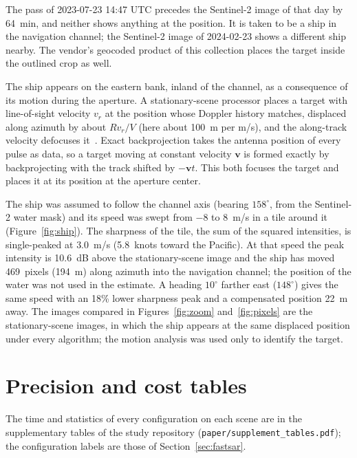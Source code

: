 \documentclass[11pt]{article}
\begin{document}
The pass of 2023-07-23 14:47 UTC precedes the Sentinel-2 image of that day by 64~min, and neither shows anything at the position. It is taken to be a ship in the navigation channel; the Sentinel-2 image of 2024-02-23 shows a different ship nearby. The vendor's geocoded product of this collection places the target inside the outlined crop as well.

The ship appears on the eastern bank, inland of the channel, as a consequence of its motion during the aperture. A stationary-scene processor places a target with line-of-sight velocity $v_r$ at the position whose Doppler history matches, displaced along azimuth by about $R v_r / V$ (here about 100~m per m/s), and the along-track velocity defocuses it~\cite{raney1971}. Exact backprojection takes the antenna position of every pulse as data, so a target moving at constant velocity $\mathbf{v}$ is formed exactly by backprojecting with the track shifted by $-\mathbf{v} t$. This both focuses the target and places it at its position at the aperture center.

The ship was assumed to follow the channel axis (bearing $158^\circ$, from the Sentinel-2 water mask) and its speed was swept from $-8$ to $8$~m/s in a tile around it (Figure~\ref{fig:ship}). The sharpness of the tile, the sum of the squared intensities, is single-peaked at $3.0$~m/s (5.8~knots toward the Pacific). At that speed the peak intensity is 10.6~dB above the stationary-scene image and the ship has moved 469~pixels (194~m) along azimuth into the navigation channel; the position of the water was not used in the estimate. A heading $10^\circ$ farther east ($148^\circ$) gives the same speed with an 18\% lower sharpness peak and a compensated position 22~m away. The images compared in Figures~\ref{fig:zoom} and~\ref{fig:pixels} are the stationary-scene images, in which the ship appears at the same displaced position under every algorithm; the motion analysis was used only to identify the target.

\section{Precision and cost tables}
\label{app:stats}

The time and statistics of every configuration on each scene are in the supplementary tables of the study repository (\texttt{paper/supplement\_tables.pdf}); the configuration labels are those of Section~\ref{sec:fastsar}.


\end{document}
